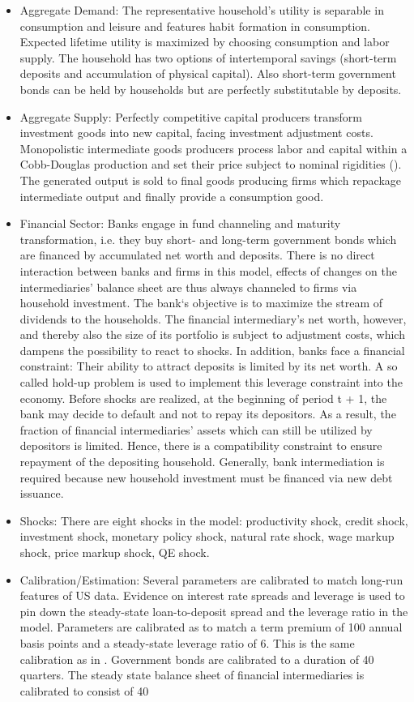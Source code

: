 \documentclass[11pt,a4paper]{article}
\begin{document}
	\begin{itemize}
		\item Aggregate Demand: The representative household's utility is separable in consumption and leisure and features habit formation in consumption. Expected lifetime utility is maximized by choosing consumption and labor supply. The household has two options of intertemporal savings (short-term deposits and accumulation of physical capital). Also short-term government bonds can be held by households but are perfectly substitutable by deposits.
		\item Aggregate Supply: Perfectly competitive capital producers transform investment goods into new capital, facing investment adjustment costs. Monopolistic intermediate goods producers process labor and capital within a Cobb-Douglas production and set their price subject to nominal rigidities (\cite{Calvo1983}). The generated output is sold to final goods producing firms which repackage intermediate output and finally provide a consumption good. 
		\item Financial Sector: Banks engage in fund channeling and maturity transformation, i.e. they buy short- and long-term government bonds which are financed by accumulated net worth and deposits. There is no direct interaction between banks and firms in this model, effects of changes on the intermediaries' balance sheet are thus always channeled to firms via household investment. The bank`s objective is to maximize the stream of dividends to the households. The financial intermediary's net worth, however, and thereby also the size of its portfolio is subject to adjustment costs, which dampens the possibility to react to shocks. In addition, banks face a financial constraint: Their ability to attract deposits is limited by its net worth. A so called hold-up problem is used to implement this leverage constraint into the economy. Before shocks are realized, at the beginning of period t + 1, the bank may decide to default and not to repay its depositors. As a result, the fraction of financial intermediaries' assets which can still be utilized by depositors is limited. Hence, there is a compatibility constraint to ensure repayment of the depositing household. Generally, bank intermediation is required because new household investment must be financed via new debt issuance.
		\item Shocks: There are eight shocks in the model: productivity shock, credit shock, investment shock, monetary policy shock, natural rate shock, wage markup shock, price markup shock, QE shock.
		\item Calibration/Estimation: Several parameters are calibrated to match long-run features of US data. Evidence on interest rate spreads and leverage is used to pin down the steady-state loan-to-deposit spread and the leverage ratio in the model. Parameters are calibrated as to match a term premium of 100 annual basis points and a steady-state leverage ratio of 6. This is the same calibration as in \cite{GertlerKaradi2013}. Government bonds are calibrated to a duration of 40 quarters. The steady state balance sheet of financial intermediaries is calibrated to consist of 40%
	\end{itemize}
\end{document}
